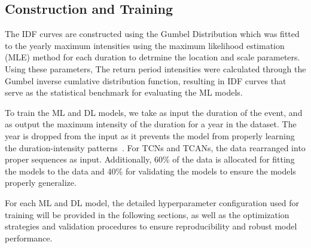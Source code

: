 \subsection{Construction and Training}
The IDF curves are constructed using the Gumbel Distribution which was fitted to the yearly maximum intensities using the maximum likelihood estimation (MLE) method for each duration to detrmine the location and scale parameters.
Using these parameters, The return period intensities were calculated through the Gumbel inverse cumlative distribution function, resulting in IDF curves that serve as the statistical benchmark for evaluating the ML models.

\vspace{1em}

To train the ML and DL models, we take as input the duration of the event, and as output the maximum intensity of the duration for a year in the dataset. The year is dropped from the input as it prevents the model from properly learning the duration-intensity patterns~\cite{14}. For TCNs and TCANs, the data rearranged into proper sequences as input. Additionally, 60\% of the data is allocated for fitting the models to the data and 40\% for validating the models to ensure the models properly generalize. 

\vspace{1em}

For each ML and DL model, the detailed hyperparameter configuration used for training will be provided in the following sections, as well as the optimization strategies and validation procedures to ensure reproducibility and robust model performance.



